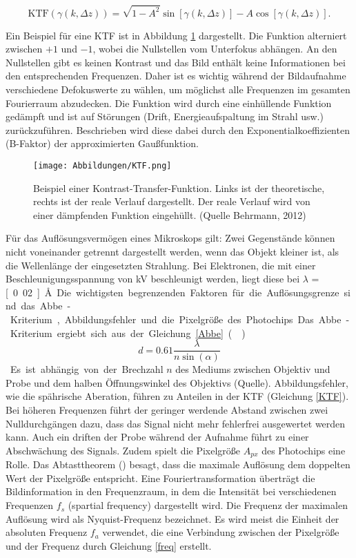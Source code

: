 \begin{equation}
	\text{KTF}(\gamma(k,\Delta z)) = \sqrt{1-A^2} \sin[\gamma(k,\Delta z)] - A \cos[\gamma(k,\Delta z)]. \label{KTF}
\end{equation}

Ein Beispiel für eine KTF ist in Abbildung \ref{KTF_pic} dargestellt.
Die Funktion alterniert zwischen $+1$ und $-1$, wobei die Nullstellen vom Unterfokus abhängen.
An den Nullstellen gibt es keinen Kontrast und das Bild enthält keine Informationen bei den entsprechenden Frequenzen.
Daher ist es wichtig während der Bildaufnahme verschiedene Defokuswerte zu wählen, um möglichst alle Frequenzen im gesamten Fourierraum abzudecken.
Die Funktion wird durch eine einhüllende Funktion gedämpft und ist auf Störungen (Drift, Energieaufspaltung im Strahl usw.) zurückzuführen.
Beschrieben wird diese dabei durch den Exponentialkoeffizienten (B-Faktor) der approximierten Gaußfunktion.

\begin{figure}[h!]
\texttt{[image: Abbildungen/KTF.png]}
\caption[Beispiel einer Kontrast-Transfer-Funktion]{Beispiel einer Kontrast-Transfer-Funktion. Links ist der theoretische, rechts ist der reale Verlauf dargestellt. Der reale Verlauf wird von einer  dämpfenden Funktion eingehüllt. (Quelle Behrmann,
2012)}
\label{KTF_pic}
\end{figure}

Für das Auflösungsvermögen eines Mikroskops gilt: Zwei Gegenstände können nicht voneinander getrennt dargestellt werden, wenn das Objekt kleiner ist, als die Wellenlänge der eingesetzten Strahlung.
Bei Elektronen, die mit einer Beschleunigungsspannung von \unit[300]{kV} beschleunigt werden, liegt diese bei $\lambda$ = \unit[0.02]{\AA}.
Die wichtigsten begrenzenden Faktoren für die Auflösungsgrenze sind das Abbe-Kriterium, Abbildungsfehler und die Pixelgröße des Photochips.
Das Abbe-Kriterium ergiebt sich aus der Gleichung \eqref{Abbe} (\cite{alex}).

\begin{equation}
	d = 0.61 \frac{\lambda}{n \sin(\alpha)} \label{Abbe}
\end{equation}

Es ist abhängig von der Brechzahl $n$ des Mediums zwischen Objektiv und Probe und dem halben Öffnungswinkel des Objektivs (Quelle).
Abbildungsfehler, wie die spährische Aberation, führen zu Anteilen in der KTF (Gleichung \eqref{KTF}).
Bei höheren Frequenzen führt der geringer werdende Abstand zwischen zwei Nulldurchgängen dazu, dass das Signal nicht mehr fehlerfrei ausgewertet werden kann.
Auch ein driften der Probe während der Aufnahme führt zu einer Abschwächung des Signals.
Zudem spielt die Pixelgröße $A_{px}$ des Photochips eine Rolle.
Das Abtasttheorem (\cite{numerical_recipes}) besagt, dass die maximale Auflösung dem doppelten Wert der Pixelgröße entspricht.
Eine Fouriertransformation überträgt die Bildinformation in den Frequenzraum, in dem die Intensität bei verschiedenen Frequenzen $f_s$ (spartial frequency) dargestellt wird.
Die Frequenz der maximalen Auflösung wird als Nyquist-Frequenz bezeichnet.
Es wird meist die Einheit der absoluten Frequenz $f_a$ verwendet, die eine Verbindung zwischen der Pixelgröße und der Frequenz durch Gleichung \eqref{freq} erstellt.

